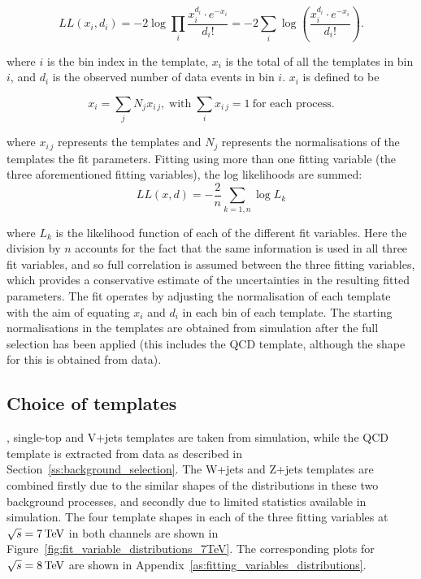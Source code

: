 \begin{equation}
\label{log_likelihood}
LL\left(x_i, d_i\right) = -2 \log{\prod\limits_{i}\frac{x_i^{d_i}\cdot
e^{-x_i}}{d_i!}}=-2\sum\limits_{i}\log{\left(\frac{x_i^{d_i}\cdot e^{-x_i}}{d_i!}\right)}.
\end{equation}

where $i$ is the bin index in the template, $x_i$ is the total of all the templates in bin $i$, and $d_i$ is
the observed number of data events in  bin $i$. $x_i$ is defined to be

\begin{equation}
\label{eq:sum_mc}
x_i = \sum\limits_{j}N_{j}x_{i\,j},\;\text{with}\;\sum\limits_{i}x_{i\,j}=1\ \text{for each process}.
\end{equation}

where $x_{i\,j}$ represents the templates and $N_{j}$ represents the normalisations of the templates \ie the
fit parameters. Fitting using more than one fitting variable (the three aforementioned fitting variables), the
log likelihoods are summed:
\begin{equation}
\label{eq:log_L_final}
LL\left(x, d\right) = -\frac{2}{n} \sum\limits_{k=1,n} \log{L_k}
\end{equation}

where $L_k$ is the likelihood function of each of the different fit variables. Here the division by $n$
accounts for the fact that the same information is used in all three fit variables, and so full correlation is
assumed between the three fitting variables, which provides a conservative estimate of the uncertainties in
the resulting fitted parameters. The fit operates by adjusting the normalisation of each template with the aim
of equating $x_{i}$ and $d_{i}$ in each bin of each template. The starting normalisations in the templates are
obtained from simulation after the full selection has been applied (this includes the QCD template, although
the shape for this is obtained from data).

\subsection{Choice of templates}
\label{choice_of_templates}

\ttbar, single-top and V+jets templates are taken from simulation, while the QCD template is extracted from
data as described in Section~\ref{ss:background_selection}. The W+jets and Z+jets templates are combined
firstly due to the similar shapes of the distributions in these two background processes, and secondly due to
limited statistics available in simulation. The four template shapes in each of the three fitting variables at
$\sqrt{s}=7\,\text{Te\hspace{-.08em}V}$ in both channels are shown in Figure~\ref{fig:fit_variable_distributions_7TeV}. The
corresponding plots for $\sqrt{s}=8\,\text{Te\hspace{-.08em}V}$ are shown in Appendix~\ref{as:fitting_variables_distributions}.

